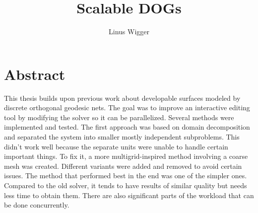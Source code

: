 \documentclass[a4paper,twoside,12pt,nochapterprefix]{scrbook}
\title{Scalable DOGs}
\author{Linus Wigger}
\begin{document}
\maketitle

\chapter{Abstract}\label{sec:abstract}
This thesis builds upon previous work about developable surfaces modeled by discrete orthogonal geodesic nets. The goal was to improve an interactive editing tool by modifying the solver so it can be parallelized. Several methods were implemented and tested. The first approach was based on domain decomposition and separated the system into smaller mostly independent subproblems. This didn't work well because the separate units were unable to handle certain important things. To fix it, a more multigrid-inspired method involving a coarse mesh was created. Different variants were added and removed to avoid certain issues. The method that performed best in the end was one of the simpler ones. Compared to the old solver, it tends to have results of similar quality but needs less time to obtain them. There are also significant parts of the workload that can be done concurrently.\newline

\end{document}
